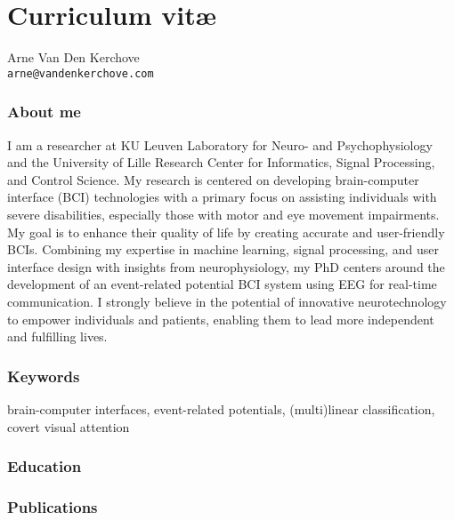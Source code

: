 \chapter*{Curriculum vit\ae}
Arne Van Den Kerchove \\
\texttt{arne@vandenkerchove.com}

\subsection*{About me}
I am a researcher at KU Leuven Laboratory for Neuro- and Psychophysiology
and the University of Lille Research Center for Informatics, Signal Processing,
and Control Science. My research is centered on developing brain-computer
interface (BCI) technologies with a primary focus on assisting individuals with
severe disabilities, especially those with motor and eye movement impairments.
My goal is to enhance their quality of life by creating accurate and
user-friendly BCIs. Combining my expertise in machine learning, signal
processing, and user interface design with insights from neurophysiology, my
PhD centers around the development of an event-related potential BCI system
using EEG for real-time communication. I strongly believe in the potential of
innovative neurotechnology to empower individuals and patients, enabling them
to lead more independent and fulfilling lives.

\subsection*{Keywords}
brain-computer interfaces, event-related
potentials, (multi)linear classification, covert visual attention

\subsection*{Education}

\begin{cvlist}
\end{cvlist}

\subsection*{Publications}
\begin{refsection}
\nocite{%
	VanDenKerchove2020,
	Libert2022,
	VanDenKerchove2022,
	VanDenKerchove2024,
	VanDenKerchove2024a,
}
\printbibliography[heading=none, resetnumbers=true]
\end{refsection}

